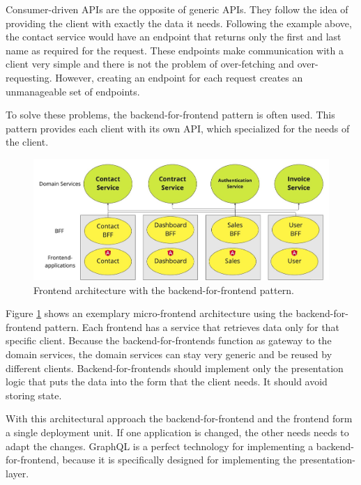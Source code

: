 Consumer-driven APIs are the opposite of generic APIs. They follow the idea of providing the client with exactly the data it needs. Following the example above, the contact service would have an endpoint that returns only the first and last name as required for the request. These endpoints make communication with a client very simple and there is not the problem of over-fetching and over-requesting. However, creating an endpoint for each request creates an unmanageable set of endpoints. \cite{misc:2019:leitner:backend-for-frontends}


To solve these problems, the backend-for-frontend pattern is often used. This pattern provides each client with its own API, which specialized for the needs of the client. \cite{book:2018:richardson:microservices-patterns}

\ifshowImages
\begin{figure}[H]
\centering
\includegraphics[width=0.8\linewidth]{images/ui-bff-architecture.jpeg}
\caption{Frontend architecture with the backend-for-frontend pattern.}\label{figure:state-of-the-art:ui-bff-architecture}
\end{figure}
\fi

Figure \ref{figure:state-of-the-art:ui-bff-architecture} shows an exemplary micro-frontend architecture using the backend-for-frontend pattern. Each frontend has a service that retrieves data only for that specific client. Because the backend-for-frontends function as gateway to the domain services, the domain services can stay very generic and be reused by different clients. Backend-for-frontends should implement only the presentation logic that puts the data into the form that the client needs. It should avoid storing state. \cite{misc:2019:leitner:backend-for-frontends}

With this architectural approach the backend-for-frontend and the frontend form a single deployment unit. If one application is changed, the other needs needs to adapt the changes. GraphQL is a perfect technology for implementing a backend-for-frontend, because it is specifically designed for implementing the presentation-layer.

